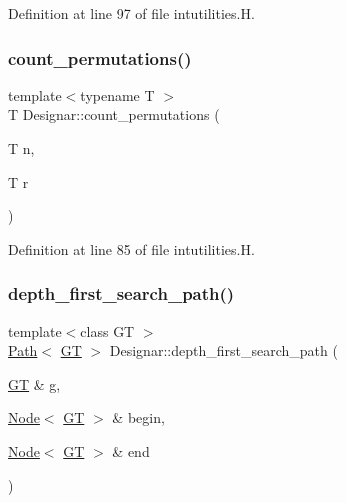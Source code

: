 Definition at line 97 of file intutilities.\+H.

\mbox{\label{namespace_designar_a9de2f2da31210c49529db21c84162576}} 
\subsubsection{\texorpdfstring{count\+\_\+permutations()}{count\_permutations()}}
{\footnotesize\ttfamily template$<$typename T $>$ \\
T Designar\+::count\+\_\+permutations (\begin{DoxyParamCaption}\item[{T}]{n,  }\item[{T}]{r }\end{DoxyParamCaption})}



Definition at line 85 of file intutilities.\+H.

\mbox{\label{namespace_designar_ab5b060dde0b717e9818c796da60b39b1}} 
\subsubsection{\texorpdfstring{depth\+\_\+first\+\_\+search\+\_\+path()}{depth\_first\_search\_path()}}
{\footnotesize\ttfamily template$<$class GT $>$ \\
\hyperlink{class_designar_1_1_path}{Path}$<$ \hyperlink{demo-buildgraph_8_c_a3001c40d2c31ca87ed96cd7d1334a55e}{GT} $>$ Designar\+::depth\+\_\+first\+\_\+search\+\_\+path (\begin{DoxyParamCaption}\item[{\hyperlink{demo-buildgraph_8_c_a3001c40d2c31ca87ed96cd7d1334a55e}{GT} \&}]{g,  }\item[{\hyperlink{namespace_designar_a5af326c65aa2bd26b26c410f2030d09e}{Node}$<$ \hyperlink{demo-buildgraph_8_c_a3001c40d2c31ca87ed96cd7d1334a55e}{GT} $>$ \&}]{begin,  }\item[{\hyperlink{namespace_designar_a5af326c65aa2bd26b26c410f2030d09e}{Node}$<$ \hyperlink{demo-buildgraph_8_c_a3001c40d2c31ca87ed96cd7d1334a55e}{GT} $>$ \&}]{end }\end{DoxyParamCaption})}



